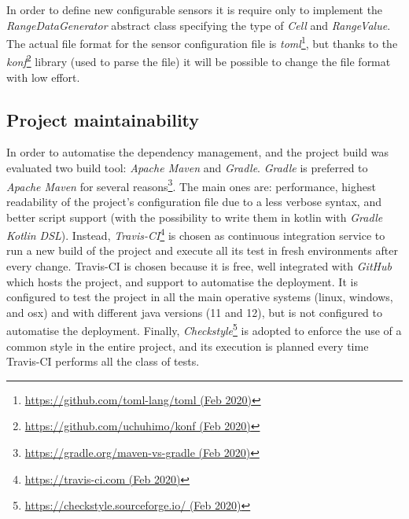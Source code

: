 % 
In order to define new configurable sensors it is require only to implement the \mbox{\textit{RangeDataGenerator}} abstract class specifying the type of \mbox{\textit{Cell}} and \mbox{\textit{RangeValue}}.
The actual file format for the sensor configuration file is \textit{toml}\footnote{\href{https://github.com/toml-lang/toml}{https://github.com/toml-lang/toml (Feb 2020)}}, but thanks to the \textit{konf}\footnote{\href{https://github.com/uchuhimo/konf}{https://github.com/uchuhimo/konf (Feb 2020)}} library (used to parse the file) it will be possible to change the file format with low effort.

\subsection*{Project maintainability}
In order to automatise the dependency management, and the project build was evaluated two build tool: \textit{Apache Maven} and \textit{Gradle}.
\textit{Gradle} is preferred to \textit{Apache Maven} for several reasons\footnote{\href{https://gradle.org/maven-vs-gradle/}{https://gradle.org/maven-vs-gradle (Feb 2020)}}. The main ones are: performance, highest readability of the project's configuration file due to a less verbose syntax, and better script support (with the possibility to write them in kotlin with \textit{Gradle Kotlin DSL}).
Instead, \textit{Travis-CI}\footnote{\href{https://travis-ci.com/}{https://travis-ci.com (Feb 2020)}} is chosen as continuous integration service to run a new build of the project and execute all its test in fresh environments after every change.
Travis-CI is chosen because it is free, well integrated with \textit{GitHub} which hosts the project, and support to automatise the deployment.
It is configured to test the project in all the main operative systems (linux, windows, and osx) and with different java versions (11 and 12), but is not configured to automatise the deployment.
Finally, \textit{Checkstyle}\footnote{\href{https://checkstyle.sourceforge.io/}{https://checkstyle.sourceforge.io/ (Feb 2020)}} is adopted to enforce the use of a common style in the entire project, and its execution is planned every time Travis-CI performs all the class of tests. 

\clearpage
